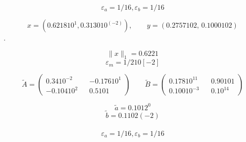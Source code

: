 \documentclass[11pt]{article}
\begin{document}
$$\varepsilon_a= 1/16, \varepsilon_b= 1/16$$


\bigskip
{}
$$x=(0.6218 10^1,  0.3130 10^(-2)), \quad \quad  y=(0.2757 102, \, 0.1000 102) $$.



$$ \|x\|_1= 0.6221$$
\bigskip
{}
\medskip
$$ \varepsilon_m=1/2 10[-2]$$


$$
 \widetilde A=\left(
\begin{array}{ccc}
0.34 10^{-2} && -0.176 10^1 \\
-0.104 10^{2} && 0.5 10{1}
\end{array} \right ) \quad \quad
 \widetilde B=\left(
\begin{array}{ccc}
0.178 10^{11}\ & & 0.90 101 \\
0.100 10^{-3} &  & 0.10^{14}
\end{array}
\right )
$$



\bigskip
{}




$$ \widetilde{a}=0.101 2^0
$$
\medskip
$$\widetilde{b}=
0.110 2(-2)$$
\\


$$\varepsilon_a= 1/16, \varepsilon_b= 1/16$$
\end{document}
